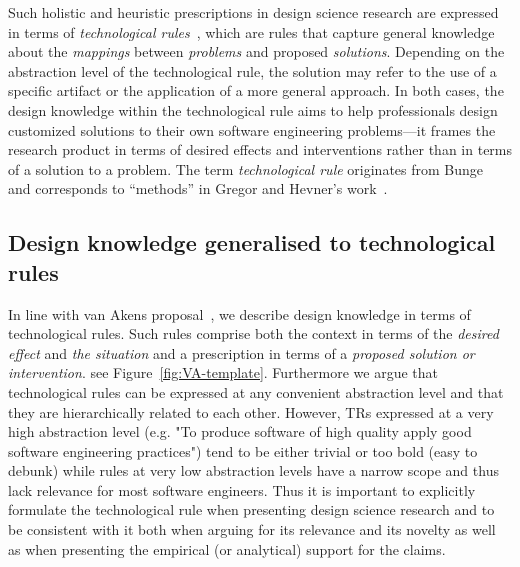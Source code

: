 \documentclass[graybox]{svmult}
\newcommand{\emelie}[1]{\textcolor{red}{{\it [Emelie says: #1]}}}
\newcommand{\emelie}[1]{}
\begin{document}
Such holistic and heuristic prescriptions in design science research are expressed in terms of \emph{technological rules}~\cite{aken_management_2004}, which are rules that capture general knowledge about the \emph{mappings} between \emph{problems} and proposed \emph{solutions}. Depending on the abstraction level of the technological rule, the solution may refer to the use of a specific artifact or the application of a more general approach. In both cases, the design knowledge within the technological rule aims to help professionals design customized solutions to their own software engineering problems---it frames the research product in terms of desired effects and interventions rather than in terms of a solution to a problem. The term \emph{technological rule} originates from Bunge~\cite{bunge_philosophy_1998} and corresponds to ``methods'' in Gregor and Hevner's work~\cite{gregor_positioning_2013}.%

\subsection{Design knowledge generalised to technological rules}
In line with van Akens proposal~\cite{van_aken_management_2004}, we describe design knowledge in terms of technological rules. Such rules comprise both the context in terms of the \emph{desired effect} and \emph{the situation} and a prescription in terms of a \emph{proposed solution or intervention}. see Figure~\ref{fig:VA-template}. Furthermore we argue that technological rules can be expressed at any convenient abstraction level and that they are hierarchically related to each other. However, TRs expressed at a very high abstraction level (e.g. "To produce software of high quality apply good software engineering practices") tend to be either trivial or too bold (easy to debunk) while rules at very low abstraction levels have a narrow scope and thus lack relevance for most software engineers. Thus it is important to explicitly formulate the technological rule when presenting design science research and to be consistent with it both when arguing for its relevance and its novelty as well as when presenting the empirical (or analytical) support for the claims. 
\end{document}
